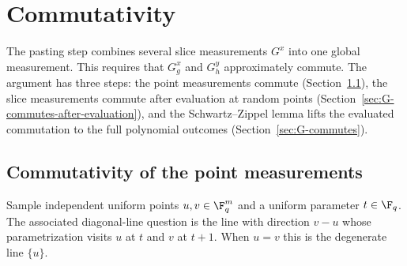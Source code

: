 \chapter{Commutativity}
\label{chap:commutativity}
\label{sec:g-comm}

The pasting step combines several slice measurements $G^x$ into one global
measurement.  This requires that $G^x_g$ and $G^y_h$ approximately commute.
The argument has three steps: the point measurements commute
(Section~\ref{sec:commutativity-points}), the slice measurements commute after
evaluation at random points (Section~\ref{sec:G-commutes-after-evaluation}),
and the Schwartz--Zippel lemma lifts the evaluated commutation to the full
polynomial outcomes (Section~\ref{sec:G-commutes}).

\section{Commutativity of the point measurements}
\label{sec:commutativity-points}

\begin{definition}\label{def:point-pair-shared-diagonal-line-distribution}
	\leanok
	Sample independent uniform points $u,v\in\F_q^m$ and a uniform parameter
	$t\in\F_q$.  The associated diagonal-line question is the line with
	direction $v-u$ whose parametrization visits $u$ at $t$ and $v$ at $t+1$.
	When $u=v$ this is the degenerate line $\{u\}$.
\end{definition}

